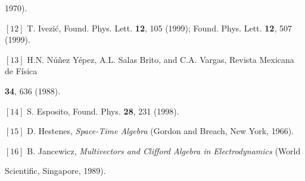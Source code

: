 \documentclass[a4paper,showpacs,preprintnumbers,amsmath,amssymb]{revtex4}
\begin{document}
1970).

\noindent $\left[ 12\right] $ T. Ivezi\'{c}, Found. Phys. Lett. \textbf{12},
105 (1999); Found. Phys. Lett. \textbf{12}, 507 (1999).

\noindent $\left[ 13\right] $ H.N. N\'{u}\~{n}ez Y\'{e}pez, A.L. Salas
Brito, and C.A. Vargas, Revista Mexicana de F\'{i}sica

\textbf{34}, 636 (1988).

\noindent $\left[ 14\right] $ S. Esposito, Found. Phys. \textbf{28}, 231
(1998).

\noindent $\left[ 15\right] $ D. Hestenes, \textit{Space-Time Algebra }%
(Gordon and Breach, New York, 1966).

\noindent $\left[ 16\right] $ B. Jancewicz, \textit{Multivectors and
Clifford Algebra in Electrodynamics} (World

Scientific, Singapore, 1989).
\end{document}
